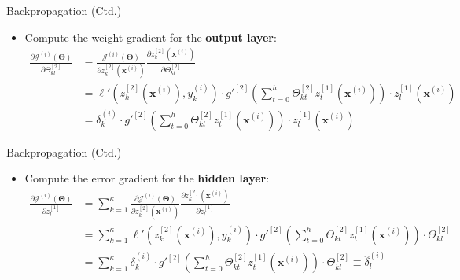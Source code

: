 \begin{frame}{Backpropagation (Ctd.)}{}\important
	\begin{itemize}
		\item Compute the weight gradient for the \textbf{output layer}:
		\begin{align*}
			\frac{\partial \mathcal{J}^{(i)}(\bm{\Theta})}{\partial \Theta_{kl}^{[2]}}
				&= \frac{\mathcal{J}^{(i)}(\bm{\Theta})}{\partial z_k^{[2]}(\bm{x}^{(i)})}
					\frac{\partial z_k^{[2]}(\bm{x}^{(i)})}{\partial \Theta_{kl}^{[2]}} \\
				&= \ell'(z_k^{[2]}(\bm{x}^{(i)}), y_k^{(i)}) \cdot g'^{[2]} \left( \sum_{t=0}^h \Theta_{kt}^{[2]} z_t^{[1]}(\bm{x}^{(i)}) \right)
					\cdot z_l^{[1]}(\bm{x}^{(i)}) \\
				&= \delta_k^{(i)} \cdot g'^{[2]} \left( \sum_{t=0}^h \Theta_{kt}^{[2]} z_t^{[1]}(\bm{x}^{(i)}) \right) \cdot z_l^{[1]}(\bm{x}^{(i)})
		\end{align*}
	\end{itemize}
\end{frame}


\begin{frame}{Backpropagation (Ctd.)}{}\important
	\begin{itemize}
		\item Compute the error gradient for the \textbf{hidden layer}:
		\begin{align*}
			\frac{\partial \mathcal{J}^{(i)}(\bm{\Theta})}{\partial z_l^{[1]}}
				&= \sum_{k=1}^\kappa \frac{\partial \mathcal{J}^{(i)}(\bm{\Theta})}{\partial z_k^{[2]}(\bm{x}^{(i)})}
					\frac{\partial z_k^{[2]}(\bm{x}^{(i)})}{\partial z_l^{[1]}} \\
				&= \sum_{k=1}^\kappa \ell'(z_k^{[2]}(\bm{x}^{(i)}), y_k^{(i)})
					\cdot g'^{[2]}\left( \sum_{t=0}^h \Theta_{kt}^{[2]} z_t^{[1]}(\bm{x}^{(i)}) \right) \cdot \Theta_{kl}^{[2]} \\
				&= \sum_{k=1}^\kappa \delta_k^{(i)} \cdot g'^{[2]} \left( \sum_{t=0}^h \Theta_{kt}^{[2]} z_t^{[1]}(\bm{x}^{(i)}) \right)
					\cdot \Theta_{kl}^{[2]} \equiv \widehat{\delta}_l^{(i)}
		\end{align*}
	\end{itemize}
\end{frame}


